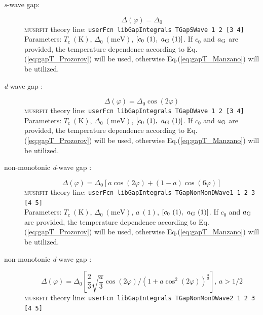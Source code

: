 \documentclass[twoside]{article}
\newcommand{\musrfit}{\textsc{musrfit}\xspace}
\begin{document}
\begin{description}
 \item[\textit{s}-wave gap:]
   \begin{equation}
     \Delta(\varphi) = \Delta_0
   \end{equation}
   \musrfit theory line: \verb?userFcn libGapIntegrals TGapSWave 1 2 [3 4]?\\[1.5ex]
    Parameters: $T_{\mathrm c}~(\mathrm{K})$, $\Delta_0~(\mathrm{meV})$, $[c_0~(1),~ a_{\rm G}~(1)]$. If $c_0$ and $a_{\rm G}$ are provided, 
    the temperature dependence according to Eq.(\ref{eq:gapT_Prozorov}) will be used, otherwise Eq.(\ref{eq:gapT_Manzano}) will be utilized.
 \item[\textit{d}-wave gap \cite{Deutscher}:] 
   \begin{equation}
     \Delta(\varphi) = \Delta_0\cos\left(2\varphi\right)
   \end{equation}
   \musrfit theory line: \verb?userFcn libGapIntegrals TGapDWave 1 2 [3 4]?\\[1.5ex]
    Parameters: $T_{\mathrm c}~(\mathrm{K})$, $\Delta_0~(\mathrm{meV})$, $[c_0~(1),~a_{\rm G}~(1)]$. If $c_0$ and $a_{\rm G}$ are provided, 
    the temperature dependence according to Eq.(\ref{eq:gapT_Prozorov}) will be used, otherwise Eq.(\ref{eq:gapT_Manzano}) will be utilized.
 \item[non-monotonic \textit{d}-wave gap \cite{Matsui}:] 
   \begin{equation}
     \Delta(\varphi) = \Delta_0\left[a \cos\left(2\varphi\right) + (1-a)\cos\left(6\varphi\right)\right]
   \end{equation}
    \musrfit theory line: \verb?userFcn libGapIntegrals TGapNonMonDWave1 1 2 3 [4 5]?\\[1.5ex]
    Parameters: $T_{\mathrm c}~(\mathrm{K})$, $\Delta_0~(\mathrm{meV})$, $a~(1)$, $[c_0~(1),~a_{\rm G}~(1)]$. If $c_0$ and $a_{\rm G}$ are provided, 
    the temperature dependence according to Eq.(\ref{eq:gapT_Prozorov}) will be used, otherwise Eq.(\ref{eq:gapT_Manzano}) will be utilized.
 \item[non-monotonic \textit{d}-wave gap \cite{Eremin}:]
    \begin{equation}
      \Delta(\varphi) = \Delta_0\left[\frac{2}{3} \sqrt{\frac{a}{3}}\cos\left(2\varphi\right) / \left( 1 + a\cos^2\left(2\varphi\right)\right)^{\frac{3}{2}}\right],\,a>1/2
    \end{equation}
    \musrfit theory line: \verb?userFcn libGapIntegrals TGapNonMonDWave2 1 2 3 [4 5]?\\[1.5ex]

\end{description}
\end{document}
